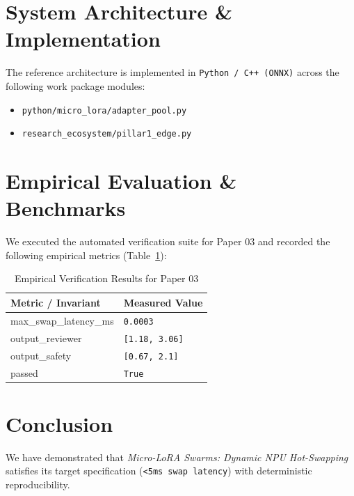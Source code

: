 \documentclass[10pt,twocolumn]{article}
\begin{document}
\section{System Architecture \& Implementation}
The reference architecture is implemented in \texttt{Python / C++ (ONNX)} across the following work package modules:
\begin{itemize}
  \item \texttt{python/micro\_lora/adapter\_pool.py}
  \item \texttt{research\_ecosystem/pillar1\_edge.py}
\end{itemize}

\section{Empirical Evaluation \& Benchmarks}
We executed the automated verification suite for Paper 03 and recorded the following empirical metrics (Table~\ref{tab:metrics}):

\begin{table}[htbp]
\centering
\caption{Empirical Verification Results for Paper 03}
\label{tab:metrics}
\begin{tabular}{ll}
\toprule
\textbf{Metric / Invariant} & \textbf{Measured Value} \\
\midrule
    max\_swap\_latency\_ms & \texttt{0.0003} \\
    output\_reviewer & \texttt{[1.18, 3.06]} \\
    output\_safety & \texttt{[0.67, 2.1]} \\
    passed & \texttt{True} \\
\bottomrule
\end{tabular}
\end{table}

\section{Conclusion}
We have demonstrated that \textit{Micro-LoRA Swarms: Dynamic NPU Hot-Swapping} satisfies its target specification (\texttt{<5ms swap latency}) with deterministic reproducibility.



\end{document}
